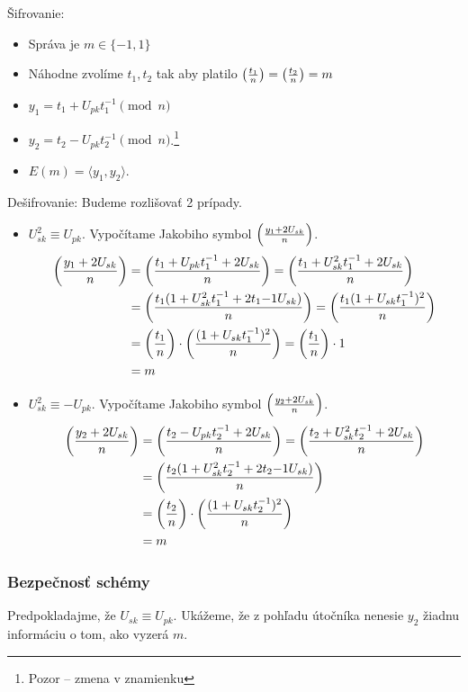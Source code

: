 \noindent
Šifrovanie:
\begin{itemize}
    \item Správa je $m\in\{-1,1\}$
    \item Náhodne zvolíme $t_1,t_2$ tak aby platilo
            $\left( \frac{t_1}{n} \right) = \left( \frac{t_2}{n} \right) = m$
    \item $y_1 = t_1 + U_{pk} t_1^{-1} \pmod{n}$
    \item $y_2 = t_2 - U_{pk} t_2^{-1} \pmod{n}$.\footnote{
            Pozor -- zmena v znamienku}
    \item $E(m) = \langle y_1, y_2 \rangle$.
\end{itemize}

\noindent
Dešifrovanie:
Budeme rozlišovať 2 prípady.
\begin{itemize}
    \item $U_{sk}^2 \equiv U_{pk}$.
        Vypočítame Jakobiho symbol $\left( \frac{y_1 + 2U_{sk}}{n} \right)$.
        \begin{align*}
            \left( \frac{y_1 + 2U_{sk}}{n} \right) &=
            \left( \frac{t_1 + U_{pk} t_1^{-1} + 2 U_{sk}}{n} \right) =
            \left( \frac{t_1 + U_{sk}^2 t_1^{-1} + 2 U_{sk}}{n} \right) \\
            &=
            \left( \frac{t_1(1 + U_{sk}^2 t_1^{-1} + 2 t_1{-1} U_{sk})}{n} \right) =
            \left( \frac{t_1(1+U_{sk}t_1^{-1})^2}{n} \right)  \\
            &=
            \left( \frac{t_1}{n} \right) \cdot \left( \frac{(1+U_{sk}t_1^{-1})^2}{n} \right)=
            \left( \frac{t_1}{n} \right) \cdot 1 \\
            &= m
        \end{align*}

    \item $U_{sk}^2 \equiv -U_{pk}$.
        Vypočítame Jakobiho symbol $\left( \frac{y_2 + 2U_{sk}}{n} \right)$.
        \begin{align*}
            \left( \frac{y_2 + 2U_{sk}}{n} \right) &=
            \left( \frac{t_2 - U_{pk} t_2^{-1} + 2 U_{sk}}{n} \right) =
            \left( \frac{t_2 + U_{sk}^2 t_2^{-1} + 2 U_{sk}}{n} \right) \\
            &=
            \left( \frac{t_2(1 + U_{sk}^2 t_2^{-1} + 2 t_2{-1} U_{sk})}{n} \right)
            \\
            &=
            \left( \frac{t_2}{n} \right) \cdot \left( \frac{(1+U_{sk}t_2^{-1})^2}{n} \right) \\
            &= m
        \end{align*}
\end{itemize}

\subsubsection{Bezpečnosť schémy}
Predpokladajme, že $U_{sk} \equiv U_{pk}$.
Ukážeme, že z pohľadu útočníka nenesie $y_2$ žiadnu informáciu o tom, ako
vyzerá $m$.

